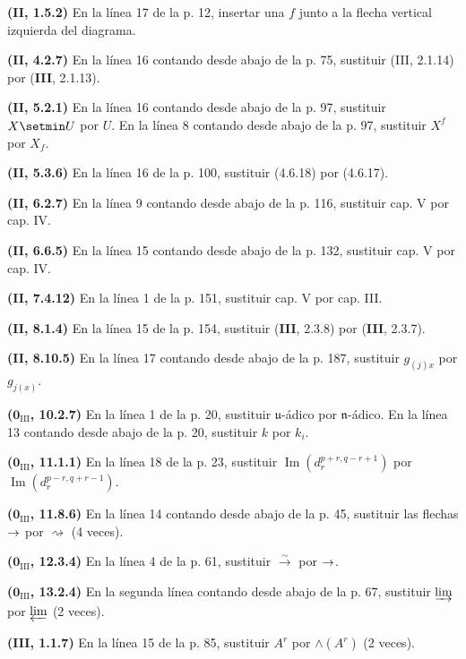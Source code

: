 \documentclass[10pt,oneside,openany]{book}
\theoremstyle{egaenv}\newtheorem*{env}{---}
\theoremstyle{egastatement}
\theoremstyle{egadescription}
\renewcommand{\to}{\mathchoice{\longrightarrow}{\rightarrow}{\rightarrow}{\rightarrow}}
\begin{document}
\noindent\textbf{(II, 1.5.2)} En la línea 17 de la p. 12, insertar una $f$
junto a la flecha vertical izquierda del diagrama.

\noindent\textbf{(II, 4.2.7)} En la línea 16 contando desde abajo de la p. 75,
sustituir (III, 2.1.14) por (\textbf{III}, 2.1.13).

\noindent\textbf{(II, 5.2.1)} En la línea 16 contando desde abajo de la p. 97,
sustituir $X\setmin U$ por $U$. En la línea 8 contando desde abajo de la p. 97,
sustituir $X^f$ por $X_f$.

\noindent\textbf{(II, 5.3.6)} En la línea 16 de la p. 100, sustituir (4.6.18)
por (4.6.17).

\noindent\textbf{(II, 6.2.7)} En la línea 9 contando desde abajo de la p. 116,
sustituir cap. V por cap. IV.

\noindent\textbf{(II, 6.6.5)} En la línea 15 contando desde abajo de la p.
132, sustituir cap. V por cap. IV.

\noindent\textbf{(II, 7.4.12)} En la línea 1 de la p. 151, sustituir cap. V
por cap. III.

\noindent\textbf{(II, 8.1.4)} En la línea 15 de la p. 154, sustituir (\textbf{III},
2.3.8) por (\textbf{III}, 2.3.7).

\noindent\textbf{(II, 8.10.5)} En la línea 17 contando desde abajo de la p.
187, sustituir $g_{(j)x}$ por $g_{j(x)}$.

\noindent\textbf{($\mathbf{0}_{\mathrm{III}}$, 10.2.7)} En la línea 1 de la p. 20,
sustituir $\mathfrak u$-ádico por $\mathfrak n$-ádico. En la línea 13 contando desde abajo
de la p. 20, sustituir $k$ por $k_i$.

\noindent\textbf{($\mathbf{0}_{\mathrm{III}}$, 11.1.1)} En la línea 18 de la p. 23,
sustituir $\operatorname{Im}(d_r^{p+r,q-r+1})$ por
$\operatorname{Im}(d_r^{p-r,q+r-1})$.

\noindent\textbf{($\mathbf{0}_{\mathrm{III}}$, 11.8.6)} En la línea 14 contando desde
abajo de la p. 45, sustituir las flechas $\to$ por $\rightsquigarrow$ (4 veces).

\noindent\textbf{($\mathbf{0}_{\mathrm{III}}$, 12.3.4)} En la línea 4 de la p. 61,
sustituir $\xrightarrow{\sim}$ por $\to$.

\noindent\textbf{($\mathbf{0}_{\mathrm{III}}$, 13.2.4)} En la segunda línea contando
desde abajo de la p. 67, sustituir $\varinjlim$ por $\varprojlim$ (2 veces).

\noindent\textbf{(III, 1.1.7)} En la línea 15 de la p. 85, sustituir $A^r$ por
$\wedge(A^r)$ (2 veces).
\end{document}

